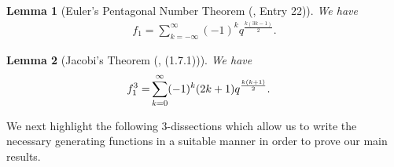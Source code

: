 \documentclass[a4paper,12pt,reqno]{amsart}
\newtheorem{lemma}{Lemma}[section]
\numberwithin{equation}{section}
\begin{document}
\bigskip 
\begin{lemma}[Euler's Pentagonal Number Theorem (\cite{r3}, Entry 22)] 
\label{lem:PNT}
We have
	\begin{align*}
		f_1=\sum_{k=-\infty}^{\infty}(-1)^kq^\frac{k(3k-1)}{2}.
	\end{align*}
\end{lemma}
\begin{lemma}[Jacobi's Theorem (\cite{r5}, (1.7.1))]
\label{2.8}
We have
\begin{align*}
	f_1^{3} 
	\notag=& \sum_{k=0}^{\infty} (-1)^{k} (2k + 1) q^{\frac{k(k+1)}{2}}.
	\end{align*}
\end{lemma}
We next highlight the following 3-dissections which allow us to write the necessary generating functions in a suitable manner in order to prove our main results.

\end{document}

